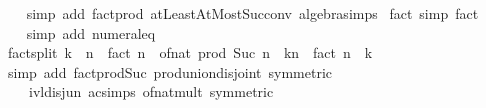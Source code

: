 \begin{isabellebody}
%
\isadelimproof
\ \ %
\endisadelimproof
%
\isatagproof
{}\isamarkupfalse%
\ {\isacharparenleft}{\kern0pt}simp\ add{\isacharcolon}{\kern0pt}\ fact{\isacharunderscore}{\kern0pt}prod\ atLeastAtMostSuc{\isacharunderscore}{\kern0pt}conv\ algebra{\isacharunderscore}{\kern0pt}simps{\isacharparenright}{\kern0pt}%
\endisatagproof
{\isafoldproof}%
%
\isadelimproof
\isanewline
%
\endisadelimproof
\isanewline
{}\isamarkupfalse%
\ fact{\isacharunderscore}{\kern0pt}{}\ {\isacharbrackleft}{\kern0pt}simp{\isacharbrackright}{\kern0pt}{\isacharcolon}{\kern0pt}\ {\isachardoublequoteopen}fact\ {}\ {\isacharequal}{\kern0pt}\ {}{\isachardoublequoteclose}\isanewline
%
\isadelimproof
\ \ %
\endisadelimproof
%
\isatagproof
{}\isamarkupfalse%
\ {\isacharparenleft}{\kern0pt}simp\ add{\isacharcolon}{\kern0pt}\ numeral{\isacharunderscore}{\kern0pt}{}{\isacharunderscore}{\kern0pt}eq{\isacharunderscore}{\kern0pt}{}{\isacharparenright}{\kern0pt}%
\endisatagproof
{\isafoldproof}%
%
\isadelimproof
\isanewline
%
\endisadelimproof
\isanewline
{}\isamarkupfalse%
\ fact{\isacharunderscore}{\kern0pt}split{\isacharcolon}{\kern0pt}\ {\isachardoublequoteopen}k\ {\isasymle}\ n\ {\isasymLongrightarrow}\ fact\ n\ {\isacharequal}{\kern0pt}\ of{\isacharunderscore}{\kern0pt}nat\ {\isacharparenleft}{\kern0pt}prod\ Suc\ {\isacharbraceleft}{\kern0pt}n\ {\isacharminus}{\kern0pt}\ k{\isachardot}{\kern0pt}{\isachardot}{\kern0pt}{\isacharless}{\kern0pt}n{\isacharbraceright}{\kern0pt}{\isacharparenright}{\kern0pt}\ {\isacharasterisk}{\kern0pt}\ fact\ {\isacharparenleft}{\kern0pt}n\ {\isacharminus}{\kern0pt}\ k{\isacharparenright}{\kern0pt}{\isachardoublequoteclose}\isanewline
%
\isadelimproof
\ \ %
\endisadelimproof
%
\isatagproof
{}\isamarkupfalse%
\ {\isacharparenleft}{\kern0pt}simp\ add{\isacharcolon}{\kern0pt}\ fact{\isacharunderscore}{\kern0pt}prod{\isacharunderscore}{\kern0pt}Suc\ prod{\isachardot}{\kern0pt}union{\isacharunderscore}{\kern0pt}disjoint\ {\isacharbrackleft}{\kern0pt}symmetric{\isacharbrackright}{\kern0pt}\isanewline
\ \ \ \ ivl{\isacharunderscore}{\kern0pt}disj{\isacharunderscore}{\kern0pt}un\ ac{\isacharunderscore}{\kern0pt}simps\ of{\isacharunderscore}{\kern0pt}nat{\isacharunderscore}{\kern0pt}mult\ {\isacharbrackleft}{\kern0pt}symmetric{\isacharbrackright}{\kern0pt}{\isacharparenright}{\kern0pt}%
\endisatagproof
{\isafoldproof}%
%
\isadelimproof
\isanewline
%
\endisadelimproof
\isanewline
{}\isamarkupfalse%
\isanewline
\isanewline
{}\isamarkupfalse%

\end{isabellebody}
